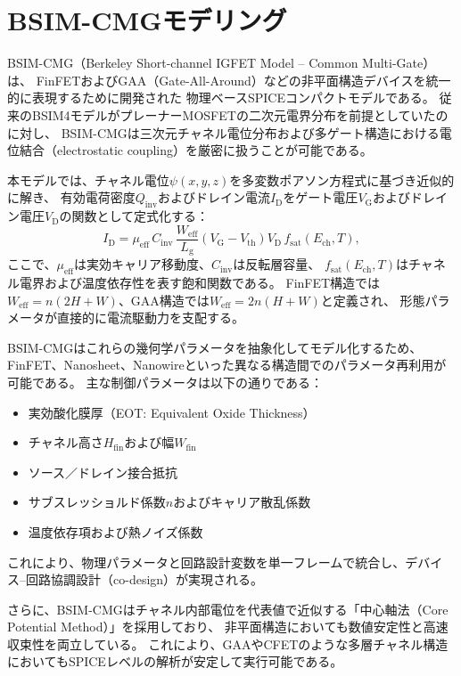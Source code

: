 \section{BSIM-CMGモデリング}
BSIM-CMG（Berkeley Short-channel IGFET Model – Common Multi-Gate）は、  
FinFETおよびGAA（Gate-All-Around）などの非平面構造デバイスを統一的に表現するために開発された  
物理ベースSPICEコンパクトモデルである。  
従来のBSIM4モデルがプレーナーMOSFETの二次元電界分布を前提としていたのに対し、  
BSIM-CMGは三次元チャネル電位分布および多ゲート構造における電位結合（electrostatic coupling）を厳密に扱うことが可能である。

本モデルでは、チャネル電位$\psi(x,y,z)$を多変数ポアソン方程式に基づき近似的に解き、  
有効電荷密度$Q_\mathrm{inv}$およびドレイン電流$I_\mathrm{D}$をゲート電圧$V_\mathrm{G}$およびドレイン電圧$V_\mathrm{D}$の関数として定式化する：
\begin{equation}
I_\mathrm{D} =
\mu_\mathrm{eff} \, C_\mathrm{inv} \,
\frac{W_\mathrm{eff}}{L_\mathrm{g}}
(V_\mathrm{G} - V_\mathrm{th}) V_\mathrm{D}
\, f_\mathrm{sat}(E_\mathrm{ch}, T),
\end{equation}
ここで、$\mu_\mathrm{eff}$は実効キャリア移動度、$C_\mathrm{inv}$は反転層容量、  
$f_\mathrm{sat}(E_\mathrm{ch},T)$はチャネル電界および温度依存性を表す飽和関数である。  
FinFET構造では$W_\mathrm{eff}=n(2H+W)$、GAA構造では$W_\mathrm{eff}=2n(H+W)$と定義され、  
形態パラメータが直接的に電流駆動力を支配する。

BSIM-CMGはこれらの幾何学パラメータを抽象化してモデル化するため、  
FinFET、Nanosheet、Nanowireといった異なる構造間でのパラメータ再利用が可能である。  
主な制御パラメータは以下の通りである：
\begin{itemize}
    \item 実効酸化膜厚（EOT: Equivalent Oxide Thickness）  
    \item チャネル高さ$H_\mathrm{fin}$および幅$W_\mathrm{fin}$  
    \item ソース／ドレイン接合抵抗  
    \item サブスレッショルド係数$n$およびキャリア散乱係数  
    \item 温度依存項および熱ノイズ係数  
\end{itemize}
これにより、物理パラメータと回路設計変数を単一フレームで統合し、デバイス–回路協調設計（co-design）が実現される。

さらに、BSIM-CMGはチャネル内部電位を代表値で近似する「中心軸法（Core Potential Method）」を採用しており、  
非平面構造においても数値安定性と高速収束性を両立している。  
これにより、GAAやCFETのような多層チャネル構造においてもSPICEレベルの解析が安定して実行可能である。


